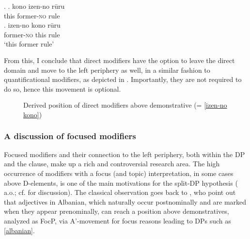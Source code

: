 \ex. \ag. kono izen-no rūru\\
this former-\textsc{no} rule\\
\bg. izen-no kono rūru\\
former-\textsc{no} this rule\\
`this former rule’ \label{izen-no kono}

From this, I conclude that direct modifiers have the option to leave the direct domain and move to the left periphery as well, in a similar fashion to quantificational modifiers, as depicted in . Importantly, they are not required to do so, hence this movement is optional.

\begin{figure}
\centering
\caption{Derived position of direct modifiers above demonstrative (= \ref{izen-no kono})}
\label{Direct modifiers above demonstrative}
\end{figure}

\subsubsection{A discussion of focused modifiers} \label{focus,japanese}
Focused modifiers and their connection to the left periphery, both within the DP and the clause, make up a rich and controversial research area. The high occurrence of modifiers with a focus (and topic) interpretation, in some cases above D-elements, is one of the main motivations for the split-DP hypothesis (\citealt{kiss:1998:identificational, kiss:2007:topic, giusti:1996:is, dimitrova:1998:fragments, ihsane:2001:specific, laenzlinger:2005:french, kim:2019:syntax} a.o.; cf. \citealt[140–151]{alex:2007:nounphrase} for discussion). The classical observation goes back to \citet{giusti:1996:is, dimitrova:1998:fragments}, who point out that adjectives in Albanian, which naturally occur postnominally and are marked when they appear prenominally, can reach a position above demonstratives, analyzed as FocP, via A'-movement for focus reasons leading to DPs such as \ref{albanian}. 

